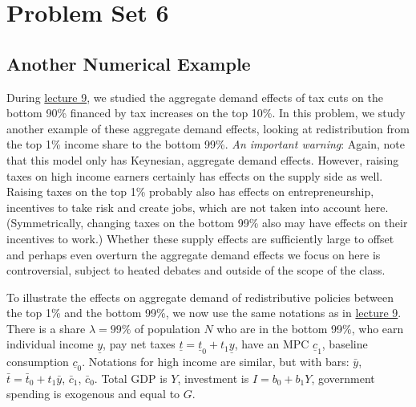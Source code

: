 \documentclass[]{book}
\theoremstyle{definition}
\theoremstyle{definition}
\theoremstyle{definition}
\theoremstyle{remark}
\begin{document}
\chapter{Problem Set 6}\label{pset6}

\section*{Another Numerical Example}\label{another-numerical-example}

During \protect\hyperlink{redistributive}{lecture 9}, we studied the
aggregate demand effects of tax cuts on the bottom 90\% financed by tax
increases on the top 10\%. In this problem, we study another example of
these aggregate demand effects, looking at redistribution from the top
1\% income share to the bottom 99\%. \emph{An important warning}: Again,
note that this model only has Keynesian, aggregate demand effects.
However, raising taxes on high income earners certainly has effects on
the supply side as well. Raising taxes on the top 1\% probably also has
effects on entrepreneurship, incentives to take risk and create jobs,
which are not taken into account here. (Symmetrically, changing taxes on
the bottom 99\% also may have effects on their incentives to work.)
Whether these supply effects are sufficiently large to offset and
perhaps even overturn the aggregate demand effects we focus on here is
controversial, subject to heated debates and outside of the scope of the
class.

To illustrate the effects on aggregate demand of redistributive policies
between the top 1\% and the bottom 99\%, we now use the same notations
as in \protect\hyperlink{redistributive}{lecture 9}. There is a share
\(\lambda = 99\%\) of population \(N\) who are in the bottom 99\%, who
earn individual income \(\underline{y}\), pay net taxes
\(\underline{t}=\underline{t}_0 + t_1 \underline{y}\), have an MPC
\(\underline{c}_1\), baseline consumption \(\underline{c}_0\). Notations
for high income are similar, but with bars: \(\bar{y}\),
\(\bar{t}=\bar{t}_0+t_1 \bar{y}\), \(\bar{c}_1\), \(\bar{c}_0\). Total
GDP is \(Y\), investment is \(I=b_0 +b_1 Y\), government spending is
exogenous and equal to \(G\).
\end{document}
